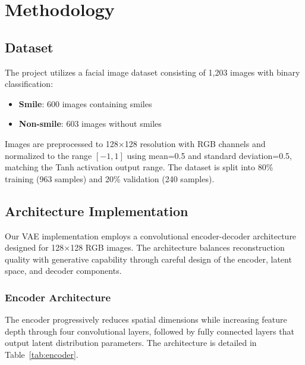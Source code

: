 \documentclass[conference]{IEEEtran}
\begin{document}
\section{Methodology}

\subsection{Dataset}

The project utilizes a facial image dataset consisting of 1,203 images with binary classification:
\begin{itemize}
    \item \textbf{Smile}: 600 images containing smiles
    \item \textbf{Non-smile}: 603 images without smiles
\end{itemize}

Images are preprocessed to 128×128 resolution with RGB channels and normalized to the range $[-1, 1]$ using mean=0.5 and standard deviation=0.5, matching the Tanh activation output range. The dataset is split into 80\% training (963 samples) and 20\% validation (240 samples).

\subsection{Architecture Implementation}

Our VAE implementation employs a convolutional encoder-decoder architecture designed for 128×128 RGB images. The architecture balances reconstruction quality with generative capability through careful design of the encoder, latent space, and decoder components.

\subsubsection{Encoder Architecture}

The encoder progressively reduces spatial dimensions while increasing feature depth through four convolutional layers, followed by fully connected layers that output latent distribution parameters. The architecture is detailed in Table~\ref{tab:encoder}.
\end{document}
